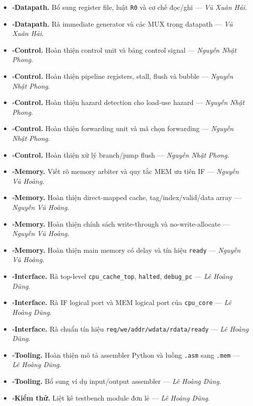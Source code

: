 \documentclass[11pt,a4paper]{article}
\theoremstyle{definition}
\theoremstyle{remark}
\newcommand{\checkbox}{\ensuremath{\square}}
\begin{document}
\begin{itemize}
		\item \checkbox \textbf{Datapath.} Bổ sung register file, luật \texttt{R0} và cơ chế đọc/ghi --- \textit{Vũ Xuân Hải}.
		\item \checkbox \textbf{Datapath.} Rà immediate generator và các MUX trong datapath --- \textit{Vũ Xuân Hải}.
		\item \checkbox \textbf{Control.} Hoàn thiện control unit và bảng control signal --- \textit{Nguyễn Nhật Phong}.
		\item \checkbox \textbf{Control.} Hoàn thiện pipeline registers, stall, flush và bubble --- \textit{Nguyễn Nhật Phong}.
		\item \checkbox \textbf{Control.} Hoàn thiện hazard detection cho load-use hazard --- \textit{Nguyễn Nhật Phong}.
		\item \checkbox \textbf{Control.} Hoàn thiện forwarding unit và mã chọn forwarding --- \textit{Nguyễn Nhật Phong}.
		\item \checkbox \textbf{Control.} Hoàn thiện xử lý branch/jump flush --- \textit{Nguyễn Nhật Phong}.
		\item \checkbox \textbf{Memory.} Viết rõ memory arbiter và quy tắc MEM ưu tiên IF --- \textit{Nguyễn Vũ Hoàng}.
		\item \checkbox \textbf{Memory.} Hoàn thiện direct-mapped cache, tag/index/valid/data array --- \textit{Nguyễn Vũ Hoàng}.
		\item \checkbox \textbf{Memory.} Hoàn thiện chính sách write-through và no-write-allocate --- \textit{Nguyễn Vũ Hoàng}.
		\item \checkbox \textbf{Memory.} Hoàn thiện main memory có delay và tín hiệu \texttt{ready} --- \textit{Nguyễn Vũ Hoàng}.
		\item \checkbox \textbf{Interface.} Rà top-level \texttt{cpu\_cache\_top}, \texttt{halted}, \texttt{debug\_pc} --- \textit{Lê Hoàng Dũng}.
		\item \checkbox \textbf{Interface.} Rà IF logical port và MEM logical port của \texttt{cpu\_core} --- \textit{Lê Hoàng Dũng}.
		\item \checkbox \textbf{Interface.} Rà chuẩn tín hiệu \texttt{req/we/addr/wdata/rdata/ready} --- \textit{Lê Hoàng Dũng}.
		\item \checkbox \textbf{Tooling.} Hoàn thiện mô tả assembler Python và luồng \texttt{.asm} sang \texttt{.mem} --- \textit{Lê Hoàng Dũng}.
		\item \checkbox \textbf{Tooling.} Bổ sung ví dụ input/output assembler --- \textit{Lê Hoàng Dũng}.
		\item \checkbox \textbf{Kiểm thử.} Liệt kê testbench module đơn lẻ --- \textit{Lê Hoàng Dũng}.

\end{itemize}
\end{document}
